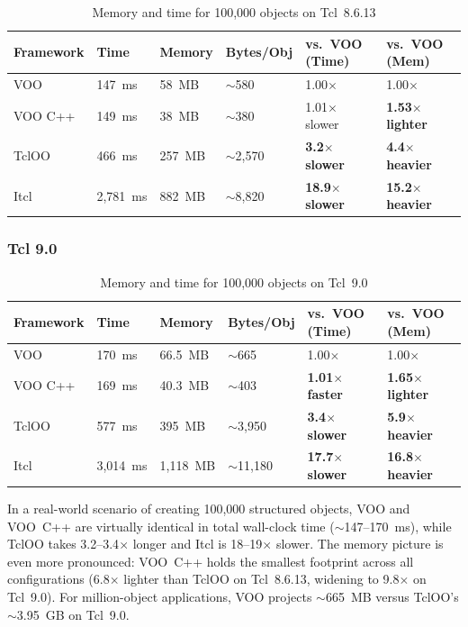 \begin{table}[H]
\centering
\caption{Memory and time for 100,000 objects on Tcl~8.6.13}
\begin{tabular}{@{}llllll@{}}
\toprule
\textbf{Framework} & \textbf{Time} & \textbf{Memory} & \textbf{Bytes/Obj} & \textbf{vs.\ VOO (Time)} & \textbf{vs.\ VOO (Mem)} \\
\midrule
VOO       & 147~ms    & 58~MB   & $\sim$580   & 1.00$\times$             & 1.00$\times$ \\
VOO C++   & 149~ms    & 38~MB   & $\sim$380   & 1.01$\times$ slower      & \textbf{1.53$\times$ lighter} \\
TclOO     & 466~ms    & 257~MB  & $\sim$2,570 & \textbf{3.2$\times$ slower} & \textbf{4.4$\times$ heavier} \\
Itcl      & 2,781~ms  & 882~MB  & $\sim$8,820 & \textbf{18.9$\times$ slower} & \textbf{15.2$\times$ heavier} \\
\bottomrule
\end{tabular}
\end{table}

\subsubsection*{Tcl 9.0}

\begin{table}[H]
\centering
\caption{Memory and time for 100,000 objects on Tcl~9.0}
\begin{tabular}{@{}llllll@{}}
\toprule
\textbf{Framework} & \textbf{Time} & \textbf{Memory} & \textbf{Bytes/Obj} & \textbf{vs.\ VOO (Time)} & \textbf{vs.\ VOO (Mem)} \\
\midrule
VOO       & 170~ms    & 66.5~MB   & $\sim$665    & 1.00$\times$              & 1.00$\times$ \\
VOO C++   & 169~ms    & 40.3~MB   & $\sim$403    & \textbf{1.01$\times$ faster} & \textbf{1.65$\times$ lighter} \\
TclOO     & 577~ms    & 395~MB    & $\sim$3,950  & \textbf{3.4$\times$ slower}  & \textbf{5.9$\times$ heavier} \\
Itcl      & 3,014~ms  & 1,118~MB  & $\sim$11,180 & \textbf{17.7$\times$ slower} & \textbf{16.8$\times$ heavier} \\
\bottomrule
\end{tabular}
\end{table}

In a real-world scenario of creating 100,000 structured objects, VOO and VOO~C++ are
virtually identical in total wall-clock time ($\sim$147--170~ms), while TclOO takes
3.2--3.4$\times$ longer and Itcl is 18--19$\times$ slower. The memory picture is even
more pronounced: VOO~C++ holds the smallest footprint across all configurations
(6.8$\times$ lighter than TclOO on Tcl~8.6.13, widening to 9.8$\times$ on Tcl~9.0).
For million-object applications, VOO projects $\sim$665~MB versus TclOO's $\sim$3.95~GB
on Tcl~9.0.

